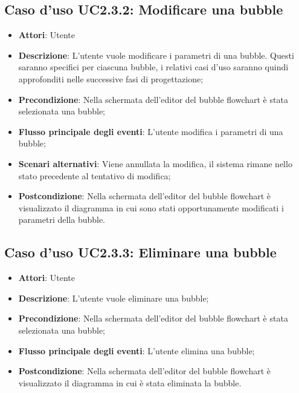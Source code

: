 \documentclass[../AnalisiDeiRequisiti.tex]{subfiles}
\begin{document}
					\subsection{Caso d'uso UC2.3.2: Modificare una bubble}
					\begin{itemize}
						\item \textbf{Attori}: Utente
						\item \textbf{Descrizione}: L'utente vuole modificare i parametri di una bubble. Questi saranno specifici per ciascuna bubble, i relativi casi d'uso saranno quindi approfonditi nelle successive fasi di progettazione;
						\item \textbf{Precondizione}: Nella schermata dell'editor del bubble flowchart è stata selezionata una bubble;
						\item \textbf{Flusso principale degli eventi}: L'utente modifica i parametri di una bubble;
						\item \textbf{Scenari alternativi}: Viene annullata la modifica, il sistema	rimane nello stato precedente al tentativo di modifica;
						\item \textbf{Postcondizione}: Nella schermata dell'editor del bubble flowchart è visualizzato il diagramma in cui sono stati opportunamente modificati i parametri della bubble.
					\end{itemize}
					\subsection{Caso d'uso UC2.3.3: Eliminare una bubble}
					\begin{itemize}
						\item \textbf{Attori}: Utente
						\item \textbf{Descrizione}: L'utente vuole eliminare una bubble;
						\item \textbf{Precondizione}: Nella schermata dell'editor del bubble flowchart è stata selezionata una bubble;
						\item \textbf{Flusso principale degli eventi}: L'utente elimina una bubble;
						\item \textbf{Postcondizione}: Nella schermata dell'editor del bubble flowchart è visualizzato il diagramma in cui è stata eliminata la bubble.
					\end{itemize}
\end{document}
